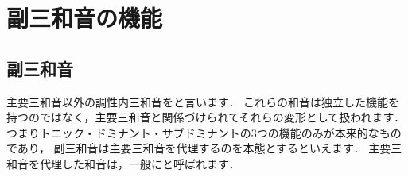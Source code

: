 \documentclass[dvipdfmx,uplatex,b5paper,openany,jbase=12Q,nomag*,textwidth-limit=44%
               ]{gachimuchi}[2020/05/05]
\begin{document}
\section{副三和音の機能}
\subsection{副三和音}
主要三和音以外の調性内三和音をと言います．%
これらの和音は独立した機能を持つのではなく，主要三和音と関係づけられてそれらの変形として扱われます．
つまりトニック・ドミナント・サブドミナントの3つの機能のみが本来的なものであり，
副三和音は主要三和音を代理するのを本態とするといえます．
主要三和音を代理した和音は，一般にと呼ばれます．
\end{document}
